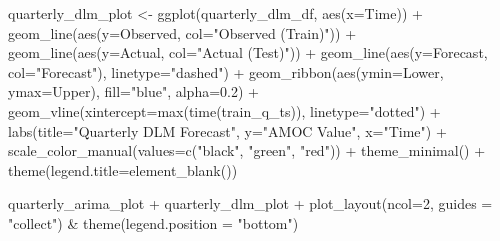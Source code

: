 \documentclass[
  11pt,
]{article}
\newenvironment{Shaded}{\begin{snugshade}}{\end{snugshade}}
\newcommand{\AttributeTok}[1]{\textcolor[rgb]{0.40,0.45,0.13}{#1}}
\newcommand{\DecValTok}[1]{\textcolor[rgb]{0.68,0.00,0.00}{#1}}
\newcommand{\FloatTok}[1]{\textcolor[rgb]{0.68,0.00,0.00}{#1}}
\newcommand{\FunctionTok}[1]{\textcolor[rgb]{0.28,0.35,0.67}{#1}}
\newcommand{\NormalTok}[1]{\textcolor[rgb]{0.00,0.23,0.31}{#1}}
\newcommand{\OtherTok}[1]{\textcolor[rgb]{0.00,0.23,0.31}{#1}}
\newcommand{\SpecialCharTok}[1]{\textcolor[rgb]{0.37,0.37,0.37}{#1}}
\newcommand{\StringTok}[1]{\textcolor[rgb]{0.13,0.47,0.30}{#1}}
\begin{document}
\begin{Shaded}
\begin{Highlighting}[]
\NormalTok{quarterly\_dlm\_plot }\OtherTok{\textless{}{-}} \FunctionTok{ggplot}\NormalTok{(quarterly\_dlm\_df, }\FunctionTok{aes}\NormalTok{(}\AttributeTok{x=}\NormalTok{Time)) }\SpecialCharTok{+}
  \FunctionTok{geom\_line}\NormalTok{(}\FunctionTok{aes}\NormalTok{(}\AttributeTok{y=}\NormalTok{Observed, }\AttributeTok{col=}\StringTok{"Observed (Train)"}\NormalTok{)) }\SpecialCharTok{+}
  \FunctionTok{geom\_line}\NormalTok{(}\FunctionTok{aes}\NormalTok{(}\AttributeTok{y=}\NormalTok{Actual, }\AttributeTok{col=}\StringTok{"Actual (Test)"}\NormalTok{)) }\SpecialCharTok{+}
  \FunctionTok{geom\_line}\NormalTok{(}\FunctionTok{aes}\NormalTok{(}\AttributeTok{y=}\NormalTok{Forecast, }\AttributeTok{col=}\StringTok{"Forecast"}\NormalTok{), }\AttributeTok{linetype=}\StringTok{"dashed"}\NormalTok{) }\SpecialCharTok{+}
  \FunctionTok{geom\_ribbon}\NormalTok{(}\FunctionTok{aes}\NormalTok{(}\AttributeTok{ymin=}\NormalTok{Lower, }\AttributeTok{ymax=}\NormalTok{Upper), }\AttributeTok{fill=}\StringTok{"blue"}\NormalTok{, }\AttributeTok{alpha=}\FloatTok{0.2}\NormalTok{) }\SpecialCharTok{+}
  \FunctionTok{geom\_vline}\NormalTok{(}\AttributeTok{xintercept=}\FunctionTok{max}\NormalTok{(}\FunctionTok{time}\NormalTok{(train\_q\_ts)), }\AttributeTok{linetype=}\StringTok{"dotted"}\NormalTok{) }\SpecialCharTok{+}
  \FunctionTok{labs}\NormalTok{(}\AttributeTok{title=}\StringTok{"Quarterly DLM Forecast"}\NormalTok{, }\AttributeTok{y=}\StringTok{"AMOC Value"}\NormalTok{, }\AttributeTok{x=}\StringTok{"Time"}\NormalTok{) }\SpecialCharTok{+}
  \FunctionTok{scale\_color\_manual}\NormalTok{(}\AttributeTok{values=}\FunctionTok{c}\NormalTok{(}\StringTok{"black"}\NormalTok{, }\StringTok{"green"}\NormalTok{, }\StringTok{"red"}\NormalTok{)) }\SpecialCharTok{+}
  \FunctionTok{theme\_minimal}\NormalTok{() }\SpecialCharTok{+}
  \FunctionTok{theme}\NormalTok{(}\AttributeTok{legend.title=}\FunctionTok{element\_blank}\NormalTok{())}
\end{Highlighting}
\end{Shaded}

\begin{Shaded}
\begin{Highlighting}[]
\NormalTok{quarterly\_arima\_plot }\SpecialCharTok{+}\NormalTok{ quarterly\_dlm\_plot }\SpecialCharTok{+} 
  \FunctionTok{plot\_layout}\NormalTok{(}\AttributeTok{ncol=}\DecValTok{2}\NormalTok{, }\AttributeTok{guides =} \StringTok{"collect"}\NormalTok{) }\SpecialCharTok{\&} 
  \FunctionTok{theme}\NormalTok{(}\AttributeTok{legend.position =} \StringTok{"bottom"}\NormalTok{)}
\end{Highlighting}
\end{Shaded}
\end{document}
